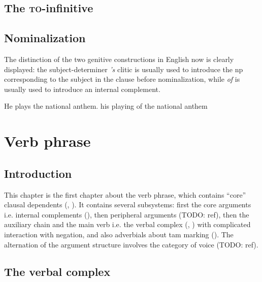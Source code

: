 \documentclass[UTF8, a4paper, oneside, scheme=plain, 12pt]{ctexbook}
\newcommand{\form}[1]{\emph{#1}}
\newcommand{\formcat}[1]{\textsc{#1}}
\begin{document}
\section{The \formcat{to}-infinitive}

\section{Nominalization}

The distinction of the two genitive constructions in English 
now is clearly displayed:
the subject-determiner \form{'s} clitic 
is usually used to introduce the \ac{np} corresponding to 
the subject in the clause before nominalization,
while \form{of} is usually used to introduce 
an internal complement.

\begin{exe}
    \ex \begin{xlist}
        \ex He plays the national anthem.
        \ex his playing of the national anthem
    \end{xlist}
\end{exe}


\chapter{Verb phrase}\label{chap:verb-phrase}

\section{Introduction}

This chapter is the first chapter about the verb phrase,
which contains ``core'' clausal dependents 
(, ).
It contains several subsystems: 
first the core arguments i.e. internal complements (),
then peripheral arguments (TODO: ref), 
then the auxiliary chain and the main verb i.e. the verbal complex
(, ) 
with complicated interaction with negation, 
and also adverbials about \acs{tam} marking 
(). 
The alternation of the argument structure involves the category of voice (TODO: ref).

\section{The verbal complex}\label{sec:verbal-complex}
\end{document}
